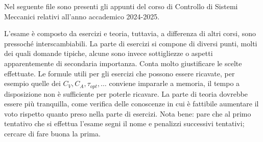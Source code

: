\intro
Nel seguente file sono presenti gli appunti del corso di Controllo di Sistemi Meccanici relativi all'anno accademico 2024-2025.

L'esame è composto da esercizi e teoria, tuttavia, a differenza di altri corsi, sono pressoché interscambiabili.
La parte di esercizi si compone di diversi punti, molti dei quali domande tipiche, alcune sono invece sottigliezze o aspetti apparentemente di secondaria importanza. Conta molto giustificare le scelte effettuate.
Le formule utili per gli esercizi che possono essere ricavate, per esempio quelle dei \(C_V,C_A,\tau_{opt},\dots\) conviene impararle a memoria, il tempo a disposizione non è sufficiente per poterle ricavare.
La parte di teoria dovrebbe essere più tranquilla, come verifica delle conoscenze in cui è fattibile aumentare il voto rispetto quanto preso nella parte di esercizi.
Nota bene: pare che al primo tentativo che si effettua l'esame segni il nome e penalizzi successivi tentativi; cercare di fare buona la prima.